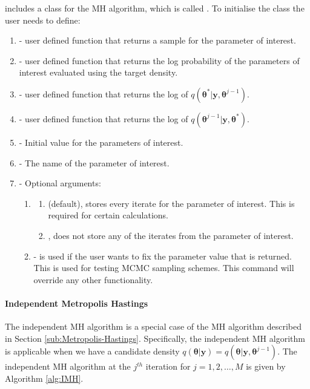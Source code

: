 \documentclass[article]{jss}
\begin{document}
 includes a class for the MH algorithm, which is called
.  To initialise the class the user needs to define:
\begin{enumerate}
\item {} - user defined function that returns a sample for the
  parameter of interest.
\item {} - user defined function that returns the log
  probability of the parameters of interest evaluated using the target
  density.
\item {} - user defined function that returns the log of
  $q\left(\bm{\theta}^{\ast}|\bm{y},\bm{\theta}^{j-1}\right).$
\item {} - user defined function that returns the log of
  $q\left(\bm{\theta}^{j-1}|\bm{y},\bm{\theta}^{*}\right).$
\item {} - Initial value for the parameters of interest.
\item {} - The name of the parameter of interest.
\item {} - Optional arguments:

\begin{enumerate}
\item {} 
\begin{enumerate}  
 \item {} (default), stores every iterate for
  the parameter of interest. This is required for certain
  calculations.
\item {}, does not store any of the iterates from the parameter of
  interest.
\end{enumerate}
\item {} - is used if the user wants to fix the
  parameter value that is returned. This is used for testing MCMC
  sampling schemes.  This command will override any other
  functionality.
\end{enumerate}
\end{enumerate}
\paragraph{Independent Metropolis Hastings}

The independent MH algorithm is a special case of the MH algorithm
described in Section \ref{sub:Metropolis-Hastings}. Specifically, the
independent MH algorithm is applicable when we have a candidate
density
$q(\bm{\theta}|\bm{y})=q(\bm{\theta}|\bm{y},\bm{\theta}^{j-1})$.  The
independent MH algorithm at the $j^{th}$ iteration for
$j=1,2,\ldots,M$ is given by Algorithm \ref{alg:IMH}.
\end{document}
